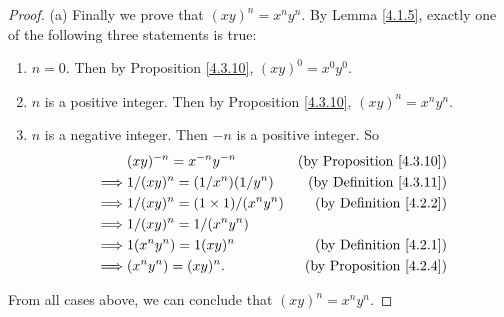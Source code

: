 \begin{proof}{(a)}
Finally we prove that \((xy)^n = x^n y^n\).
By Lemma \ref{4.1.5}, exactly one of the following three statements is true:
\begin{enumerate}[label=(\roman*)]
    \item \(n = 0\).
    Then by Proposition \ref{4.3.10}, \((xy)^0 = x^0 y^0\).
    \item \(n\) is a positive integer.
    Then by Proposition \ref{4.3.10}, \((xy)^n = x^n y^n\).
    \item \(n\) is a negative integer.
    Then \(-n\) is a positive integer.
    So
    \begin{align*}
    & (xy)^{-n} = x^{-n} y^{-n} & \text{(by Proposition \ref{4.3.10})} \\
    \implies & 1 / (xy)^n = (1 / x^n)(1 / y^n) & \text{(by Definition \ref{4.3.11})} \\
    \implies & 1 / (xy)^n = (1 \times 1) / (x^n y^n) & \text{(by Definition \ref{4.2.2})} \\
    \implies & 1 / (xy)^n = 1 / (x^n y^n) \\
    \implies & 1(x^n y^n) = 1(xy)^n & \text{(by Definition \ref{4.2.1})} \\
    \implies & (x^n y^n) = (xy)^n. & \text{(by Proposition \ref{4.2.4})}
    \end{align*}
\end{enumerate}
From all cases above, we can conclude that \((xy)^n = x^n y^n\).
\end{proof}

